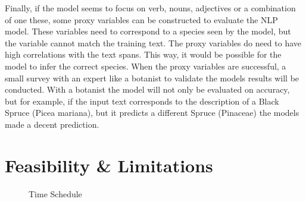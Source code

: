 \documentclass[a4paper, 12pt, oneside]{book} %
\begin{document}
Finally, if the model seems to focus on verb, nouns, adjectives or a combination of one these, some proxy variables can be constructed to evaluate the NLP model.
These variables need to correspond to a species seen by the model, but the variable cannot match the training text.
The proxy variables do need to have high correlations with the text spans.
This way, it would be possible for the model to infer the correct species.
When the proxy variables are successful, a small survey with an expert like a botanist to validate the models results will be conducted.
With a botanist the model will not only be evaluated on accuracy, but for example, if the input text corresponds to the description of a Black Spruce (Picea mariana), but it predicts a different Spruce (Pinaceae) the models made a decent prediction. 

\section{Feasibility \& Limitations}

\begin{figure} [t]
    \centering
    \caption{Time Schedule}
    \label{fig:time_schedule}
\end{figure}
\end{document}
